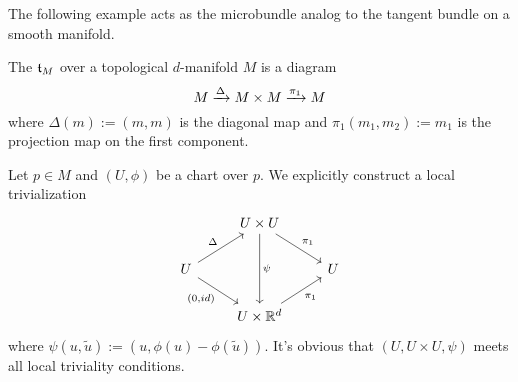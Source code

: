 \begin{myparagraph}
    The following example acts as the microbundle analog to the tangent bundle on a smooth manifold.
\end{myparagraph}

\begin{myexample}
    The  $\mathfrak{t}_M$ over a topological $d$-manifold $M$ is a diagram
    \[ M \xrightarrow{\Delta} M \times M \xrightarrow{\pi_1} M{} \]
    where $\Delta(m) := (m, m)$ is the diagonal map and $\pi_1(m_1, m_2) := m_1$ is the projection map on the first component.
    \begin{myproof}
        Let $p \in M$ and $(U, \phi)$ be a chart over $p$.
        We explicitly construct a local trivialization
        \[\begin{tikzcd}
            & U \times U \ar[dr, "\pi_1"] \ar[dd, "{\psi}"] & \\
            U \ar[ur, "\Delta"] \ar[dr, "{(0, id)}"'] & & U \\
            & U \times \R^d \ar[ur, "\pi_1"'] &
        \end{tikzcd}\]
        where $\psi(u, \tilde{u}) := (u, \phi(u) - \phi(\tilde{u}))$.
        It's obvious that $(U, U \times U, \psi)$ meets all local triviality conditions.
    \end{myproof}
\end{myexample}